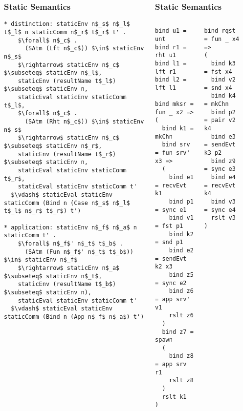 \documentclass{beamer}
\begin{document}
\begin{frame}[fragile]
\begin{columns}
\begin{frame}[fragile]
\begin{lstlisting}[language=logic, mathescape]
\end{lstlisting}
\end{frame}

\begin{frame}[fragile]
	\frametitle{Static Semantics}
\begin{lstlisting}[language=logic, mathescape]
* distinction: staticEnv n$_s$ n$_l$ t$_l$ n staticComm n$_r$ t$_r$ t' . 
    $\forall$ n$_c$ . 
      (SAtm (Lft n$_c$)) $\in$ staticEnv n$_s$
    $\rightarrow$ staticEnv n$_c$ $\subseteq$ staticEnv n$_l$,
    staticEnv (resultName t$_l$) $\subseteq$ staticEnv n,
    staticEval staticEnv staticComm t$_l$,
    $\forall$ n$_c$ . 
      (SAtm (Rht n$_c$)) $\in$ staticEnv n$_s$
    $\rightarrow$ staticEnv n$_c$ $\subseteq$ staticEnv n$_r$, 
    staticEnv (resultName t$_r$) $\subseteq$ staticEnv n, 
    staticEval staticEnv staticComm t$_r$,
    staticEval staticEnv staticComm t'
  $\vdash$ staticEval staticEnv staticComm (Bind n (Case n$_s$ n$_l$ t$_l$ n$_r$ t$_r$) t')

* application: staticEnv n$_f$ n$_a$ n staticComm t' . 
    $\forall$ n$_f$' n$_t$ t$_b$ . 
      (SAtm (Fun n$_f$' n$_t$ t$_b$)) $\in$ staticEnv n$_f$
    $\rightarrow$ staticEnv n$_a$ $\subseteq$ staticEnv n$_t$, 
    staticEnv (resultName t$_b$) $\subseteq$ staticEnv n),
    staticEval staticEnv staticComm t'
  $\vdash$ staticEval staticEnv staticComm (Bind n (App n$_f$ n$_a$) t')
\end{lstlisting}
\end{frame}

\begin{frame}[fragile]
	\frametitle{Static Semantics}
\begin{columns}
\begin{column}{0.5\textwidth}
\begin{lstlisting}[language=normal_lang, mathescape]
bind u1 = unt
bind r1 = rht u1
bind l1 = lft r1
bind l2 = lft l1

bind mksr = fun _ x2 => 
(
  bind k1 = mkChn
  bind srv = fun srv' x3 =>
  (
    bind e1 = recvEvt k1
    bind p1 = sync e1
    bind v1 = fst p1
    bind k2 = snd p1 
    bind e2 = sendEvt k2 x3
    bind z5 = sync e2
    bind z6 = app srv' v1
    rslt z6 
  )
  bind z7 = spawn
  (
    bind z8 = app srv r1
    rslt z8 
  )
  rslt k1
)
\end{lstlisting}
\end{column}

\begin{column}{0.5\textwidth}
\begin{lstlisting}[language=normal_lang, mathescape]
bind rqst = fun _ x4 =>
(
  bind k3 = fst x4
  bind v2 = snd x4
  bind k4 = mkChn
  bind p2 = pair v2 k4
  bind e3 = sendEvt k3 p2
  bind z9 = sync e3
  bind e4 = recvEvt k4
  bind v3 = sync e4
  rslt v3
)


\end{lstlisting}
\end{column}
\end{columns}
\end{frame}
\end{columns}
\end{frame}
\end{document}

